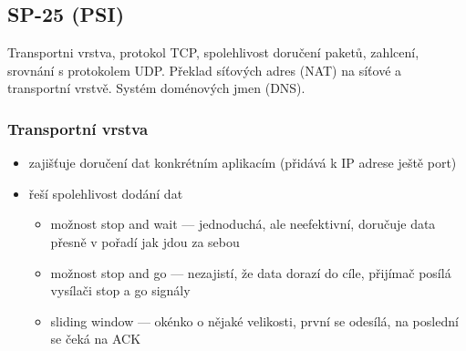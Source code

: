 \subsection{SP-25 (PSI)}
Transportni vrstva, protokol TCP, spolehlivost doručení paketů, zahlcení, srovnání s protokolem UDP. Překlad síťových adres (NAT) na síťové a transportní vrstvě. Systém doménových jmen (DNS).

\subsubsection*{Transportní vrstva}
\begin{itemize}
	\item zajišťuje doručení dat konkrétním aplikacím (přidává k IP adrese ještě port)
	\item řeší spolehlivost dodání dat
	\begin{itemize}
		\item možnost stop and wait --- jednoduchá, ale neefektivní, doručuje data přesně v pořadí jak jdou za sebou
		\item možnost stop and go --- nezajistí, že data dorazí do cíle, přijímač posílá vysílači stop a go signály
		\item sliding window --- okénko o nějaké velikosti, první se odesílá, na poslední se čeká na ACK
	\end{itemize}
\end{itemize}

